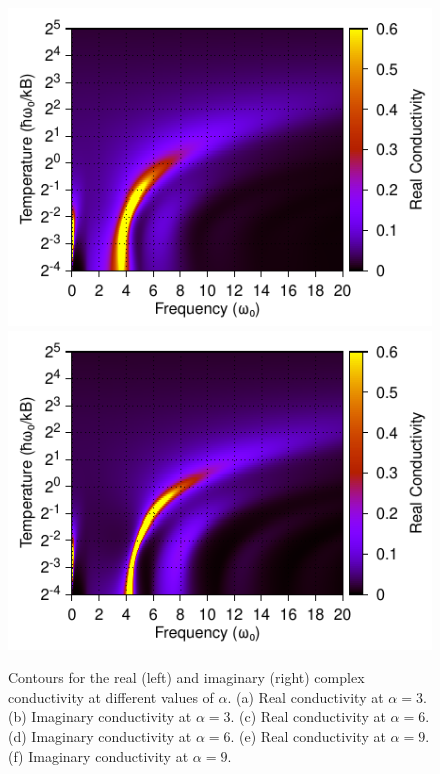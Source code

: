 \begin{figure}[t]
    \includegraphics[width=.49\textwidth]{figures/frohlich-3d-real-conductivity-alpha-5-temp-00625to32-freq-0to30-contourf-COLOUR.pdf}
    \includegraphics[width=.49\textwidth]{figures/frohlich-3d-real-conductivity-alpha-6-temp-00625to32-freq-0to30-contourf-COLOUR.pdf}

    \caption{Contours for the real (left) and imaginary (right) complex conductivity at different values of $\alpha$. (a) Real conductivity at $\alpha = 3$. (b) Imaginary conductivity at $\alpha = 3$. (c) Real conductivity at $\alpha = 6$. (d) Imaginary conductivity at $\alpha = 6$. (e) Real conductivity at $\alpha = 9$. (f) Imaginary conductivity at $\alpha = 9$.}
    \label{fig:osakacontour}
\end{figure}

